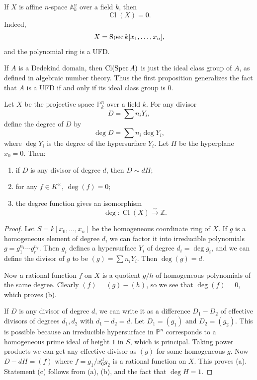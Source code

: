 \documentclass[12pt]{article}
\begin{document}
\begin{example}
    If $X$ is affine $n$-space $\mathbb A^n_k$ over a field $k$, then
    \[
        \operatorname{Cl}(X)=0.
    \]
    Indeed,
    \[
        X=\operatorname{Spec} k[x_1,\dots,x_n],
    \]
    and the polynomial ring is a UFD.
\end{example}

\begin{example}
    If $A$ is a Dedekind domain, then $\operatorname{Cl}(\operatorname{Spec} A)$ is just the ideal class group of $A$, as defined in algebraic number theory. Thus the first proposition generalizes the fact that $A$ is a UFD if and only if its ideal class group is $0$.
\end{example}

\begin{proposition}
    Let $X$ be the projective space $\mathbb P^n_k$ over a field $k$. For any divisor
    \[
        D=\sum n_i Y_i,
    \]
    define the degree of $D$ by
    \[
        \deg D=\sum n_i \deg Y_i,
    \]
    where $\deg Y_i$ is the degree of the hypersurface $Y_i$. Let $H$ be the hyperplane $x_0=0$. Then:
    \begin{enumerate}
        \item[(a)] if $D$ is any divisor of degree $d$, then $D\sim dH$;
        \item[(b)] for any $f\in K^\times$, $\deg(f)=0$;
        \item[(c)] the degree function gives an isomorphism
              \[
                  \deg:\operatorname{Cl}(X)\xrightarrow{\sim}\mathbb Z.
              \]
    \end{enumerate}
\end{proposition}

\begin{proof}
    Let $S = k[x_0,\dots,x_n]$ be the homogeneous coordinate ring of $X$. If $g$ is a homogeneous element of degree $d$, we can factor it into irreducible polynomials $g = g_1^{n_1}\cdots g_r^{n_r}$.
    Then $g_i$ defines a hypersurface $Y_i$ of degree $d_i = \deg g_i$, and we can define the divisor of $g$ to be $(g)=\sum n_i Y_i$.
    Then $\deg(g)=d$.

    Now a rational function $f$ on $X$ is a quotient $g/h$ of homogeneous polynomials of the same degree. Clearly $(f)=(g)-(h)$, so we see that $\deg(f)=0$, which proves \textup{(b)}.

    If $D$ is any divisor of degree $d$, we can write it as a difference $D_1-D_2$ of effective divisors of degrees $d_1,d_2$ with $d_1-d_2=d$.
    Let $D_1=(g_1)$ and $D_2=(g_2)$.
    This is possible because an irreducible hypersurface in $\mathbb P^n$ corresponds to a homogeneous prime ideal of height $1$ in $S$, which is principal. Taking power products we can get any effective divisor as $(g)$ for some homogeneous $g$. Now $D-dH=(f)$ where $f=g_1/x_0^d g_2$ is a rational function on $X$. This proves \textup{(a)}. Statement \textup{(c)} follows from \textup{(a)}, \textup{(b)}, and the fact that $\deg H=1$.
\end{proof}
\end{document}
